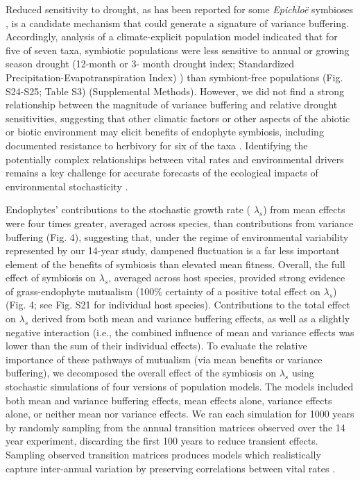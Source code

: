 \documentclass[12pt]{article}
\begin{document}
Reduced sensitivity to drought, as has been reported for some \emph{Epichlo\"{e}} symbioses \cite{decunta2021systematic}, is a candidate mechanism that could generate a signature of variance buffering.
Accordingly, analysis of a climate-explicit population model indicated that for five of seven taxa, symbiotic populations were less sensitive to annual or growing season drought (12-month or 3- month drought index; Standardized Precipitation-Evapotranspiration Index) \cite{vicente2010multiscalar}) than symbiont-free populations (Fig. S24-S25; Table S3) (Supplemental Methods).
However, we did not find a strong relationship between the magnitude of variance buffering and relative drought sensitivities, suggesting that other climatic factors or other aspects of the abiotic or biotic environment may elicit benefits of endophyte symbiosis, including documented resistance to herbivory for six of the taxa \cite{rudgers2008invasive,crawford2010fungal}.
Identifying the potentially complex relationships between vital rates and environmental drivers remains a key challenge for accurate forecasts of the ecological impacts of environmental stochasticity \cite{ehrlen2015predicting}.


Endophytes' contributions to the stochastic growth rate ( $\lambda_s$) from mean effects were four times greater, averaged across species, than contributions from variance buffering (Fig. 4),  suggesting that, under the regime of environmental variability represented by our 14-year study, dampened fluctuation is a far less important element of the benefits of symbiosis than elevated mean fitness. 
Overall, the full effect of symbiosis on $\lambda_s$, averaged across host species, provided strong evidence of grass-endophyte mutualism (100\% certainty of a positive total effect on $\lambda_s$) (Fig. 4; see Fig. S21 for individual host species).
Contributions to the total effect on $\lambda_s$ derived from both mean and variance buffering effects, as well as a slightly negative interaction (i.e., the combined influence of mean and variance effects was lower than the sum of their individual effects). To evaluate the relative importance of these pathways of mutualism (via mean benefits or variance buffering), we decomposed  the overall effect of the symbiosis on $\lambda_s$ using stochastic simulations of four versions of population models. 
The models included both mean and variance buffering effects, mean effects alone, variance effects alone, or neither mean nor variance effects. 
We ran each simulation for 1000 years by randomly sampling from the annual transition matrices observed over the 14 year experiment, discarding the first 100 years to reduce transient effects. 
Sampling observed transition matrices produces models which realistically capture inter-annual variation by preserving correlations between vital rates \cite{metcalf2015statistical}.
\end{document}
